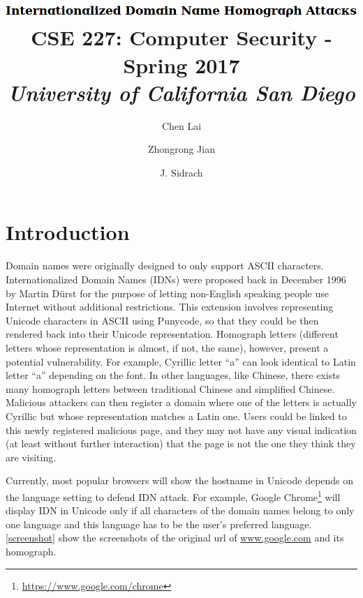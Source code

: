 \documentclass[letterpaper,twocolumn,10pt]{article}
\begin{document}
\date{}

\title{\Large
\includegraphics[height=\baselineskip]{title.png}
\\ \vspace{0.65mm} \large \normalfont
CSE 227: Computer Security - Spring 2017 \\ \textit{
University of California San Diego
}}

\author{
{\rm Chen Lai}\\
\and
{\rm Zhongrong Jian}\\
\and
{\rm J. Sidrach}\\
}

\maketitle


\section{Introduction}
Domain names were originally designed to only support ASCII characters.
Internationalized Domain Names (IDNs) were proposed back in December 1996 by Martin D\"{u}rst for the purpose of letting non-English speaking people use Internet without additional restrictions.
This extension involves representing Unicode characters in ASCII using Punycode, so that they could be then rendered back into their Unicode representation.
Homograph letters (different letters whose representation is almost, if not, the same), however, present a potential vulnerability.
For example, Cyrillic letter ``a'' can look identical to Latin letter ``a'' depending on the font.
In other languages, like Chinese, there exists many homograph letters between traditional Chinese and simplified Chinese.
Malicious attackers can then register a domain where one of the letters is actually Cyrillic but whose representation matches a Latin one.
Users could be linked to this newly registered malicious page, and they may not have any visual indication (at least without further interaction) that the page is not the one they think they are visiting.

Currently, most popular browsers will show the hostname in Unicode depends on the language setting to defend IDN attack.
For example, Google Chrome\footnote{\url{https://www.google.com/chrome}} will display IDN in Unicode only if all characters of the domain names belong to only one language and this language has to be the user's preferred language. \ref{screenshot} show the screenshots of the original url of \url{www.google.com} and its homograph.
\end{document}
